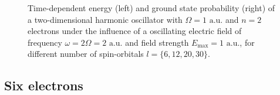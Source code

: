 \begin{figure}[!h]
{\begin{minipage}{0.6\textwidth}
    \end{minipage}
    }
    \caption{Time-dependent energy (left) and ground state probability (right)
        of a two-dimensional harmonic oscillator with $\Omega=1 \text{ a.u.}$
        and $n=2$ electrons under the influence of a oscillating electric field 
        of frequency $\omega = 2 \Omega = 2 \text{ a.u.}$ and field strength
        $E_\text{max}=1 \text{ a.u.}$,
        for different number of spin-orbitals $l=\{6,12,20,30\}$.
    }
    \label{fig:2d_n2_qd}
\end{figure}


\subsection*{Six electrons}

\begin{figure}[!h]
    \centering
\end{figure}
